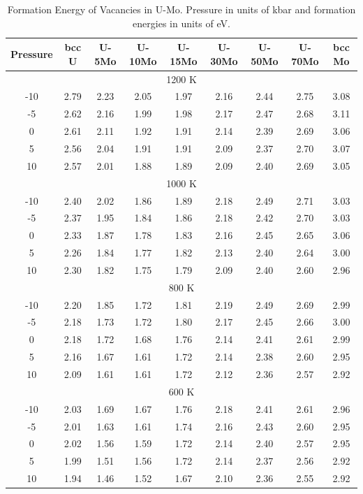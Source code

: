 \documentclass[review]{elsarticle}
\begin{document}
\begin{table}[h]
    \centering
     \caption{Formation Energy of Vacancies in U-Mo. Pressure in units of kbar and formation energies in units of eV.}
    \begin{tabular}{c|c|c|c|c|c|c|c|c}
    \toprule
 Pressure & bcc U & U-5Mo & U-10Mo & U-15Mo & U-30Mo & U-50Mo & U-70Mo & bcc Mo \\
 \midrule
 \multicolumn{9}{c}{1200 K} \\
 \hline
-10	&2.79&	2.23&	2.05&	1.97&	2.16&	2.44&	2.75&	3.08 \\
-5	&2.62&	2.16&	1.99&	1.98&	2.17&	2.47&	2.68&	3.11 \\
0	&2.61&	2.11&	1.92&	1.91&	2.14&	2.39&	2.69&	3.06 \\
5	&2.56&	2.04&	1.91&	1.91&	2.09&	2.37&	2.70&	3.07 \\
10	&2.57&	2.01&	1.88&	1.89&	2.09&	2.40&	2.69&	3.05 \\
 \midrule
  \multicolumn{9}{c}{1000 K} \\
   \hline
-10	&2.40&	2.02&	1.86&	1.89&	2.18&	2.49&	2.71&	3.03 \\
-5	&2.37&	1.95&	1.84&	1.86&	2.18&	2.42&	2.70&	3.03 \\
0	&2.33&	1.87&	1.78&	1.83&	2.16&	2.45&	2.65&	3.06 \\
5	&2.26&	1.84&	1.77&	1.82&	2.13&	2.40&	2.64&	3.00 \\
10	&2.30&	1.82&	1.75&	1.79&	2.09&	2.40&	2.60&	2.96 \\
  \midrule
  \multicolumn{9}{c}{800 K} \\
  \hline
-10	&2.20&	1.85&	1.72&	1.81&	2.19&	2.49&	2.69&	2.99 \\
-5	&2.18&	1.73&	1.72&	1.80&	2.17&	2.45&	2.66&	3.00 \\
0	&2.18&	1.72&	1.68&	1.76&	2.14&	2.41&	2.61&	2.99 \\
5	&2.16&	1.67&	1.61&	1.72&	2.14&	2.38&	2.60&	2.95 \\
10	&2.09&	1.61&	1.61&	1.72&	2.12&	2.36&	2.57&	2.92 \\
  \midrule
  \multicolumn{9}{c}{600 K} \\
  \hline
-10	&2.03&	1.69&	1.67&	1.76&	2.18&	2.41&	2.61&	2.96 \\
-5	&2.01&	1.63&	1.61&	1.74&	2.16&	2.43&	2.60&	2.95 \\
0	&2.02&	1.56&	1.59&	1.72&	2.14&	2.40&	2.57&	2.95 \\
5	&1.99&	1.51&	1.56&	1.72&	2.14&	2.37&	2.56&	2.92 \\
10	&1.94&	1.46&	1.52&	1.67&	2.10&	2.36&	2.55&	2.92 \\
\bottomrule
    \end{tabular}
    \label{tab:EformV}
\end{table}
\end{document}
